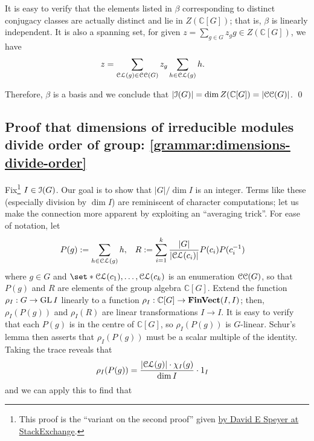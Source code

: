 \par It is easy to verify that the elements listed in $\beta$ corresponding to distinct conjugacy classes are actually distinct and lie in $Z(\mathbb{C}[G])$; that is, $\beta$ is linearly independent. It is also a spanning set, for given $z = \sum_{g \in G} z_g g \in Z(\mathbb{C}[G])$, we have
\begin{align*}
  z
  &= \sum_{\operatorname{\mathcal{CL}}(g) \in \operatorname{\mathcal{CC}}(G)}
    z_g
    \sum_{h \in \operatorname{\mathcal{CL}}(g)} h
  .
\end{align*}
\par Therefore, $\beta$ is a basis and we conclude that $\lvert \operatorname{\mathcal{I}}(G) \rvert = \dim Z(\mathbb{C}[G]) = \lvert \operatorname{\mathcal{CC}}(G) \rvert$. \qed

\subsection{Proof that dimensions of irreducible modules divide order of group: \ref{grammar:dimensions-divide-order}} %
\pan Fix\footnote{This proof is the ``variant on the second proof'' given \href{https://math.stackexchange.com/a/249328}{by David E Speyer at StackExchange}.} $I \in \operatorname{\mathcal{I}}(G)$. Our goal is to show that $\lvert G \rvert / {\dim I}$ is an integer. Terms like these (especially division by $\dim I$) are reminiscent of character computations; let us make the connection more apparent by exploiting an ``averaging trick''. For ease of notation, let
\begin{align*}
  P (g)
  &:= \sum_{h \in \operatorname{\mathcal{CL}}(g)} h
  ,
  & R
  &:= \sum_{i = 1}^{k}
    \frac{\lvert G \rvert}{\lvert \operatorname{\mathcal{CL}}(c_i) \rvert}
    P(c_i) P(c_i^{-1})
\end{align*}
where $g \in G$ and $\set*{\Class(c_1), \dots, \Class(c_k)}$ is an enumeration $\operatorname{\mathcal{CC}}(G)$, so that $P(g)$ and $R$ are elements of the group algebra $\mathbb{C}[G]$. Extend the function $\rho_I : G \to \operatorname{GL} I$ linearly to a function $\rho_I : \mathbb{C}[G] \to \operatorname{\mathbf{FinVect}}(I, I)$; then, $\rho_I (P(g))$ and $\rho_I (R)$ are linear transformations $I \to I$. It is easy to verify that each $P(g)$ is in the centre of $\mathbb{C}[G]$, so $\rho_I (P(g))$ is $G$-linear. Schur's lemma then asserts that $\rho_I (P(g))$ must be a scalar multiple of the identity. Taking the trace reveals that
\begin{align*}
  \rho_I (P(g))
  &= \frac{\lvert \operatorname{\mathcal{CL}}(g) \rvert \cdot \chi_I (g)}{\dim I} \cdot 1_I
\end{align*}
and we can apply this to find that
